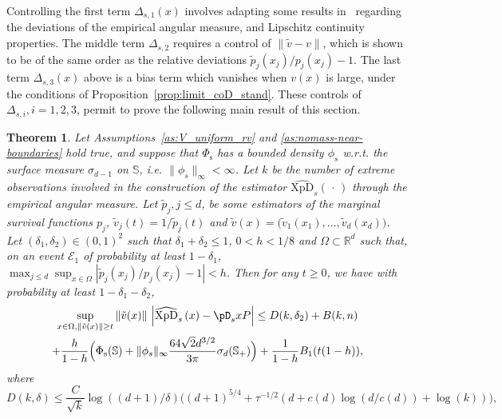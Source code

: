 \documentclass{article}
\numberwithin{equation}{section}
\newtheorem{theorem}{Theorem}[section]
\newcommand{\rset}{\mathbb{R}}
\newcommand{\point}{\,\cdot\,}
\newcommand{\sphere}{\mathbb{S}}
\newcommand{\XpDsymbol}{\mathrm{XpD}}  %
\newcommand{\coDs}[2]{\pD_s{#1}{#2}}
\newcommand{\hatcoDs}[1]{\widehat{\XpDsymbol}_s\left({#1}\right)}
\newcommand{\Phitrad}{\Phi_{\mathrm{s}}} %
\newcommand{\hatPhitrad}{\widehat{\Phi}_{\mathrm{s},k}} %
\begin{document}
Controlling the first  term $\Delta_{s,1}(x)$ involves  adapting some results in~\cite{ClemenconJalalzaiSabourinSegers2023} regarding the deviations of the empirical angular measure, and Lipschitz continuity properties. 
The middle term $\Delta_{s,2}$ requires a control of $\|\tilde v - v\|$,  which is shown to be of the same order as the relative deviations $\tilde p_j(x_j) /p_j(x_j) -1$.
The last term $\Delta_{s,3}(x)$ above is a bias term which vanishes  when $v(x)$ is large, under the conditions of  Proposition~\ref{prop:limit_coD_stand}. 
These controls of $\Delta_{s,i}, i=1,2,3$,  permit to prove the following main result of this section. 
\begin{theorem}\label{thm:main_standardized}
  Let Assumptions~\ref{as:V_uniform_rv} and \ref{as:nomass-near-boundaries} hold true, and suppose that $\Phitrad$ has a bounded density $\phi_s$ w.r.t. the surface measure $\sigma_{d-1}$ on $\sphere$, \textit{i.e.} $\|\phi_s\|_\infty<\infty$.  
  Let $k$ be the number of extreme observations involved in the construction of the estimator $\hatcoDs{\point}$ through the empirical angular measure. Let $\tilde p_j, j\le d$, be some estimators of the marginal survival functions $p_j$, $\tilde v_j(t) = 1/\tilde p_j(t)$ and $\tilde v(x) = \big(\tilde v_1(x_1), \ldots, \tilde v_d(x_d)\big)$. 
  Let $(\delta_1,\delta_2) \in(0,1)^2$ such that $\delta_1+\delta_2\le 1$, $0<h<1/8$ and  $\Omega\subset\rset^d$ such that,  on an event $\mathcal{E}_1$ of probability at least $1-\delta_1$, $\max_{j\le d}\sup_{x\in\Omega}|\tilde p_j(x_j)/p_j(x_j) - 1|< h$.   
    Then for any $t\ge 0$,  %
    we have with probability at least $1-\delta_1 - \delta_2$, 
\begin{multline*}
  \sup_{x \in \Omega, \|\tilde v(x)\|\ge t}
  \|\tilde v(x)\| ~  \Big| \hatcoDs{x} - \coDs{x}{P} \Big| \le
    D(k,\delta_2) +  B(k,n)  \\ 
    +\frac{h}{1-h}\Big(\Phitrad(\sphere)+  \|\phi_s\|_\infty\frac{64\sqrt{2} d^{3/2}}{3\pi}\sigma_{d}(\sphere_+)\Big) +  \frac{1}{1 - h} B_1(t(1-h)), 
    \end{multline*}
where %
$$D(k,\delta)\le \frac{C}{\sqrt{k}}   \log((d+1)/\delta) \Big(   (d+1)^{5/4} +
\tau^{-1/2}  (d + c(d) \log(d/c(d)) + \log(k))
  \Big), 
  $$

\end{theorem}
\end{document}
